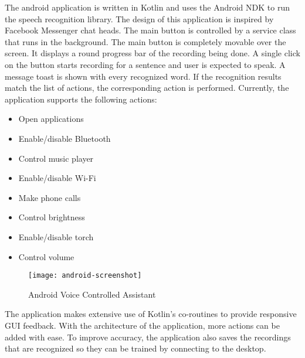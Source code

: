 The android application is written in Kotlin and uses the Android NDK to run the speech recognition library.
The design of this application is inspired by Facebook Messenger chat heads. The main button is controlled by a service class that runs in the background. The main button is completely movable over the screen. It displays a round progress bar of the recording being done. A single click on the button starts recording for a sentence and user is expected to speak. A message toast is shown with every recognized word. If the recognition results match the list of actions, the corresponding action is performed. Currently, the application supports the following actions:
\begin{itemize}
    \item Open applications
    \item Enable/disable Bluetooth
    \item Control music player
    \item Enable/disable Wi-Fi
    \item Make phone calls
    \item Control brightness        
    \item Enable/disable torch
    \item Control volume
\end{itemize}

\begin{figure}[h!]
    \centering
    \texttt{[image: android-screenshot]}
    \label{fig:android-screenshot}
    \caption{Android Voice Controlled Assistant}
\end{figure}

The application makes extensive use of Kotlin’s co-routines to provide responsive GUI feedback. With the architecture of the application, more actions can be added with ease. To improve accuracy, the application also saves the recordings that are recognized so they can be trained by connecting to the desktop.

